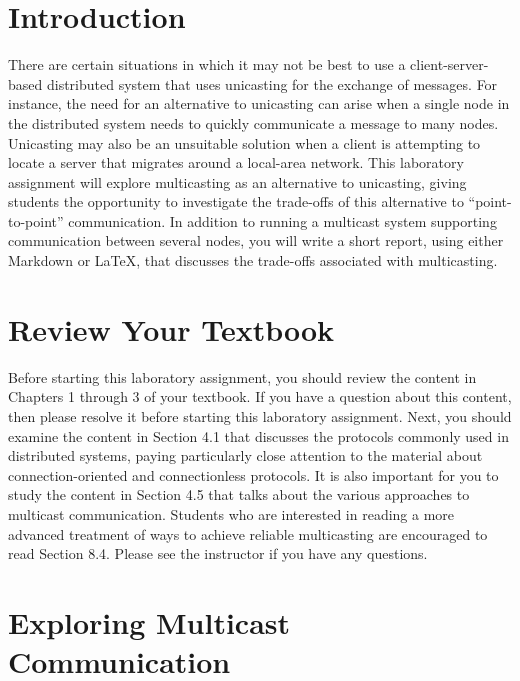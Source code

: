 

\usepackage[compact]{titlesec}



\section*{Introduction}

There are certain situations in which it may not be best to use a client-server-based distributed system that uses
unicasting for the exchange of messages. For instance, the need for an alternative to unicasting can arise when a single
node in the distributed system needs to quickly communicate a message to many nodes. Unicasting may also be an
unsuitable solution when a client is attempting to locate a server that migrates around a local-area network. This
laboratory assignment will explore multicasting as an alternative to unicasting, giving students the opportunity to
investigate the trade-offs of this alternative to ``point-to-point'' communication.  In addition to running a multicast
system supporting communication between several nodes, you will write a short report, using either Markdown or \LaTeX,
that discusses the trade-offs associated with multicasting.

\section*{Review Your Textbook}

Before starting this laboratory assignment, you should review the content in Chapters 1 through 3 of your textbook. If
you have a question about this content, then please resolve it before starting this laboratory assignment. Next, you
should examine the content in Section 4.1 that discusses the protocols commonly used in distributed systems, paying
particularly close attention to the material about connection-oriented and connectionless protocols. It is also
important for you to study the content in Section 4.5 that talks about the various approaches to multicast
communication. Students who are interested in reading a more advanced treatment of ways to achieve reliable multicasting
are encouraged to read Section 8.4. Please see the instructor if you have any questions.

\section*{Exploring Multicast Communication}

